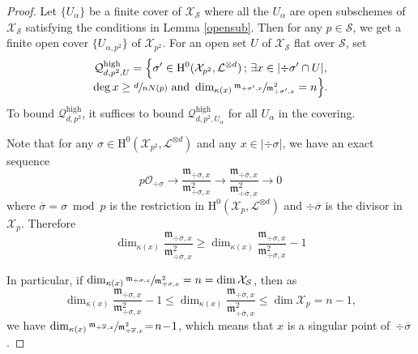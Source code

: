 \documentclass[JEP,XML,SOM,Unicode,published]{cedram}
\newcommand{\sep}{\,;\,}
\theoremstyle{plain}
\theoremstyle{definition}
\newcommand{\ho}{\mathrm{H}}
\newcommand{\m}{\mathfrak{m}}
\newcommand{\X}{\mathcal{X}}
\newcommand{\li}{\mathcal{L}}
\begin{document}
\begin{proof}[Proof]
Let $\{U_{\alpha}\}$ be a finite cover of $\X_{\mathcal{S}}$ where all the $U_{\alpha}$ are open subschemes of $\X_{\mathcal{S}}$ satisfying the conditions in Lemma \ref{opensub}. Then for any $p\in \mathcal{S}$, we get a finite open cover $\{U_{\alpha,p^2}\}$ of $\X_{p^2}$. For an open set $U$ of $\X_{\mathcal{S}}$ flat over $\mathcal{S}$, set
\begin{multline*}
\mathcal{Q}^{\mathrm{high}}_{d,p^2,U}=\Bigl\{ \sigma'\in \ho^0(\X_{p^2}, \li^{\otimes d})\sep \exists x\in |{\div \sigma'\cap U}|,\\[-5pt]\deg x\geq \sfrac{d}{nN(p)} \text{ and } \dim_{\kappa(x)}\sfrac{\m_{\div \sigma',x}}{\m^2_{\div \sigma', x}}=n \Bigr\}.
\end{multline*}
To bound $\mathcal{Q}^{\mathrm{high}}_{d,p^2}$, it suffices to bound $\mathcal{Q}^{\mathrm{high}}_{d,p^2,U_{\alpha}}$ for all $U_{\alpha}$ in the covering.

Note that for any $\sigma\in \ho^0(\X_{p^2}, \li^{\otimes d})$ and any $x\in |{\div\sigma}|$, we have an exact sequence
\[
p\mathcal{O_{\div \sigma}} \to \frac{\m_{\div \sigma,x}}{\m^2_{\div \sigma, x}} \to \frac{\m_{\div \overline{\sigma},x}}{\m^2_{\div \overline{\sigma}, x}} \to 0
\]
where $\overline{\sigma}=\sigma\bmod p$ is the restriction in $\ho^0(\X_{p}, \li^{\otimes d})$ and $\div \overline{\sigma}$ is the divisor in $\X_p$. Therefore
\[
\dim_{\kappa(x)}\frac{\m_{\div \overline{\sigma},x}}{\m^2_{\div \overline{\sigma}, x}} \geq \dim_{\kappa(x)}\frac{\m_{\div \sigma,x}}{\m^2_{\div \sigma, x}}-1
\]

In particular, if $\dim_{\kappa(x)}\sfrac{\m_{\div \sigma,x}}{\m^2_{\div \sigma, x}}=n=\dim \X_{\mathcal{S}}$, then as
\[
\dim_{\kappa(x)}\frac{\m_{\div \sigma,x}}{\m^2_{\div \sigma, x}}-1\leq \dim_{\kappa(x)}\frac{\m_{\div \overline{\sigma},x}}{\m^2_{\div \overline{\sigma}, x}} \leq \dim \X_p=n-1,
\]
we have $ \dim_{\kappa(x)}\sfrac{\m_{\div \overline{\sigma},x}}{\m^2_{\div \overline{\sigma}, x}}\!=\!n\!-\!1$, which means that $x$ is a singular point of~$\div \overline{\sigma}$.


\end{proof}
\end{document}
